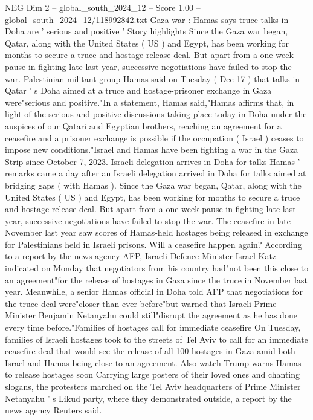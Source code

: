 \begin{textsample}{NEG Dim 2 – global\_south\_2024\_12 – Score 1.00 – global\_south\_2024\_12/118992842.txt}  \label{ex:f2_neg_241}
Gaza war : Hamas says truce talks in Doha are ' serious and positive ' Story highlights Since the Gaza war began, Qatar, along with the United States ( US ) and Egypt, has been working for months to secure a truce and hostage release deal.
But apart from a one-week pause in fighting late last year, successive negotiations have failed to stop the war.
Palestinian militant group Hamas said on Tuesday ( Dec 17 ) that talks in Qatar ' s Doha aimed at a truce and hostage-prisoner exchange in Gaza were"serious and positive."In a statement, Hamas said,"Hamas affirms that, in light of the serious and positive discussions taking place today in Doha under the auspices of our Qatari and Egyptian brothers, reaching an agreement for a ceasefire and a prisoner exchange is possible if the occupation ( Israel ) ceases to impose new conditions."Israel and Hamas have been fighting a war in the Gaza Strip since October 7, 2023.
Israeli delegation arrives in Doha for talks Hamas ' remarks came a day after an Israeli delegation arrived in Doha for talks aimed at bridging gaps ( with Hamas ).
Since the Gaza war began, Qatar, along with the United States ( US ) and Egypt, has been working for months to secure a truce and hostage release deal.
But apart from a one-week pause in fighting late last year, successive negotiations have failed to stop the war.
The ceasefire in late November last year saw scores of Hamas-held hostages being released in exchange for Palestinians held in Israeli prisons.
Will a ceasefire happen again?
According to a report by the news agency AFP, Israeli Defence Minister Israel Katz indicated on Monday that negotiators from his country had"not been this close to an agreement"for the release of hostages in Gaza since the truce in November last year.
Meanwhile, a senior Hamas official in Doha told AFP that negotiations for the truce deal were"closer than ever before"but warned that Israeli Prime Minister Benjamin Netanyahu could still"disrupt the agreement as he has done every time before."Families of hostages call for immediate ceasefire On Tuesday, families of Israeli hostages took to the streets of Tel Aviv to call for an immediate ceasefire deal that would see the release of all 100 hostages in Gaza amid both Israel and Hamas being close to an agreement.
Also watch Trump warns Hamas to release hostages soon Carrying large posters of their loved ones and chanting slogans, the protesters marched on the Tel Aviv headquarters of Prime Minister Netanyahu ' s Likud party, where they demonstrated outside, a report by the news agency Reuters said.

\end{textsample}
